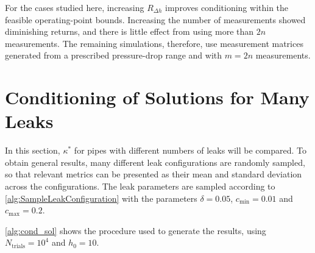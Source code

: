 For the cases studied here, increasing $R_{\Delta h}$ improves conditioning within the feasible operating-point bounds. Increasing the number of measurements showed diminishing returns, and there is little effect from using more than $2n$ measurements. The remaining simulations, therefore, use measurement matrices generated from a prescribed pressure-drop range and with $m=2n$ measurements.

\newpage
\section{Conditioning of Solutions for Many Leaks} \label{sec:cond_many_leaks}

In this section, $\kappa^*$ for pipes with different numbers of leaks will be compared. To obtain general results, many different leak configurations are randomly sampled, so that relevant metrics can be presented as their mean and standard deviation across the configurations. The leak parameters are sampled according to \autoref{alg:SampleLeakConfiguration} with the parameters $\delta=0.05$, $c_{\min}=0.01$ and $c_{\max}=0.2$.\\

\begin{algorithm}[ht]
\caption[Sample of leak configuration]{Method to uniformly sample leak locations, $z_1 < z_2<\dots<z_n$, that have a minimum spacing of $\delta$. Specifically, $z_i\in[\delta,\ell-\delta]$ and $z_{i+1}-z_i > \delta$ for all $i$. Leak coefficients are uniformly sampled between $c_{\min}$ and $c_{\max}$.}
\label{alg:SampleLeakConfiguration}
\DontPrintSemicolon
{}
\end{algorithm}

\autoref{alg:cond_sol} shows the procedure used to generate the results, using  $N_\text{trials} = 10^4$ and $h_0=10$.\\


